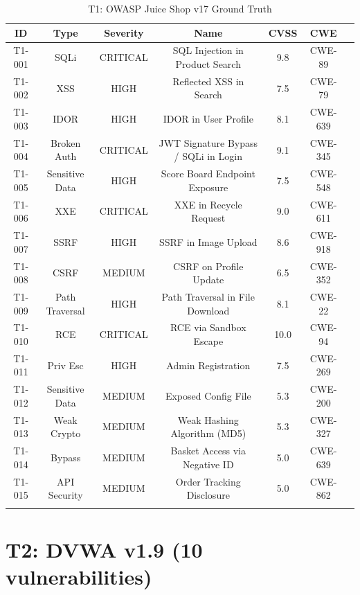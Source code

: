 \documentclass[12pt,a4paper,oneside]{book}
\begin{document}
\begin{longtable}{|c|c|c|c|c|c|c|}
\hline
\textbf{ID} & \textbf{Type} & \textbf{Severity} & \textbf{Name} & \textbf{CVSS} & \textbf{CWE} \\ \hline
\endhead
T1-001 & SQLi & CRITICAL & SQL Injection in Product Search & 9.8 & CWE-89 \\ \hline
T1-002 & XSS & HIGH & Reflected XSS in Search & 7.5 & CWE-79 \\ \hline
T1-003 & IDOR & HIGH & IDOR in User Profile & 8.1 & CWE-639 \\ \hline
T1-004 & Broken Auth & CRITICAL & JWT Signature Bypass / SQLi in Login & 9.1 & CWE-345 \\ \hline
T1-005 & Sensitive Data & HIGH & Score Board Endpoint Exposure & 7.5 & CWE-548 \\ \hline
T1-006 & XXE & CRITICAL & XXE in Recycle Request & 9.0 & CWE-611 \\ \hline
T1-007 & SSRF & HIGH & SSRF in Image Upload & 8.6 & CWE-918 \\ \hline
T1-008 & CSRF & MEDIUM & CSRF on Profile Update & 6.5 & CWE-352 \\ \hline
T1-009 & Path Traversal & HIGH & Path Traversal in File Download & 8.1 & CWE-22 \\ \hline
T1-010 & RCE & CRITICAL & RCE via Sandbox Escape & 10.0 & CWE-94 \\ \hline
T1-011 & Priv Esc & HIGH & Admin Registration & 7.5 & CWE-269 \\ \hline
T1-012 & Sensitive Data & MEDIUM & Exposed Config File & 5.3 & CWE-200 \\ \hline
T1-013 & Weak Crypto & MEDIUM & Weak Hashing Algorithm (MD5) & 5.3 & CWE-327 \\ \hline
T1-014 & Bypass & MEDIUM & Basket Access via Negative ID & 5.0 & CWE-639 \\ \hline
T1-015 & API Security & MEDIUM & Order Tracking Disclosure & 5.0 & CWE-862 \\ \hline
\caption{T1: OWASP Juice Shop v17 Ground Truth}
\label{tab:t1_ground_truth}
\end{longtable}

\section{T2: DVWA v1.9 (10 vulnerabilities)}
\end{document}
